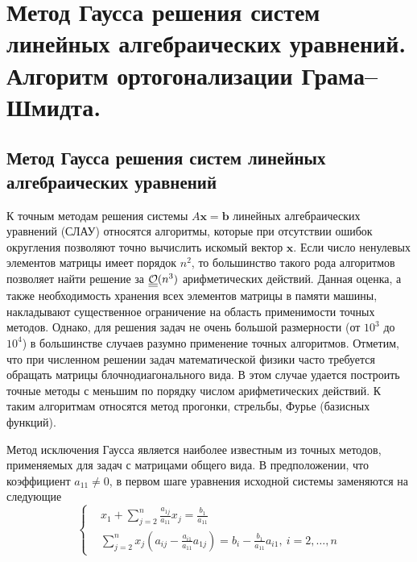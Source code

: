 \section{Метод Гаусса решения систем линейных алгебраических уравнений. Алгоритм ортогонализации Грама–Шмидта.}

\subsection*{Метод Гаусса решения систем линейных алгебраических уравнений}

К точным методам решения системы $A\mathbf{x}=\mathbf{b}$ линейных алгебраических
уравнений (СЛАУ) относятся алгоритмы, которые при отсутствии ошибок
округления позволяют точно вычислить искомый вектор $\mathbf{x}$. Если число
ненулевых элементов матрицы имеет порядок $n^2$, то большинство такого
рода алгоритмов позволяет найти решение за $\underline{\underline{\mathcal{O}}}(n^3)$ арифметических
действий. Данная оценка, а также необходимость хранения всех элементов
матрицы в памяти машины, накладывают существенное ограничение
на область применимости точных методов. Однако, для решения задач не
очень большой размерности (от $10^3$ до $10^4$) в большинстве случаев разумно
применение точных алгоритмов. Отметим, что при численном решении задач
математической физики часто требуется обращать матрицы блочнодиагонального
вида. В этом случае удается построить точные методы с
меньшим по порядку числом арифметических действий. К таким алгоритмам относятся метод прогонки, стрельбы, Фурье (базисных функций).

Метод исключения Гаусса является наиболее известным из точных
методов, применяемых для задач с матрицами общего вида. В предположении, что
коэффициент $a_{11}\neq0$, в первом шаге уравнения исходной системы заменяются на
следующие
\[\left\{
  \begin{aligned}
     & x_1+\sum_{j=2}^n\frac{a_{1j}}{a_{11}}x_j=\frac{b_1}{a_{11}}                                                \\
     & \sum_{j=2}^nx_j\left(a_{ij}-\frac{a_{i1}}{a_{11}}a_{1j}\right)=b_i-\frac{b_1}{a_{11}}a_{i1},\ i=2,\ldots,n
  \end{aligned}
  \right.\]

